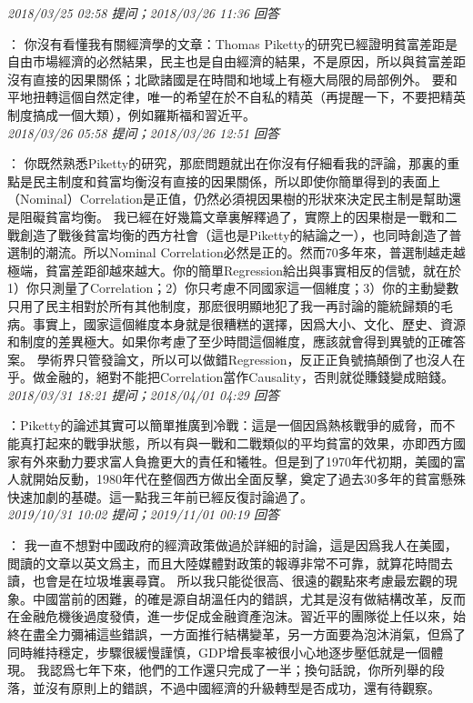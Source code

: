 \documentclass[twocolumn]{ctexart}
\begin{document}
\textit{\hfill\noindent\small 2018/03/25 02:58 提问；2018/03/26 11:36 回答}

：
你沒有看懂我有關經濟學的文章：Thomas Piketty的研究已經證明貧富差距是自由市場經濟的必然結果，民主也是自由經濟的結果，不是原因，所以與貧富差距沒有直接的因果關係；北歐諸國是在時間和地域上有極大局限的局部例外。 
要和平地扭轉這個自然定律，唯一的希望在於不自私的精英（再提醒一下，不要把精英制度搞成一個大類），例如羅斯福和習近平。
\\

\textit{\hfill\noindent\small 2018/03/26 05:58 提问；2018/03/26 12:51 回答}

：
你既然熟悉Piketty的研究，那麽問題就出在你沒有仔細看我的評論，那裏的重點是民主制度和貧富均衡沒有直接的因果關係，所以即使你簡單得到的表面上（Nominal）Correlation是正值，仍然必須視因果樹的形狀來決定民主制是幫助還是阻礙貧富均衡。 
我已經在好幾篇文章裏解釋過了，實際上的因果樹是一戰和二戰創造了戰後貧富均衡的西方社會（這也是Piketty的結論之一），也同時創造了普選制的潮流。所以Nominal Correlation必然是正的。然而70多年來，普選制越走越極端，貧富差距卻越來越大。你的簡單Regression給出與事實相反的信號，就在於1）你只測量了Correlation；2）你只考慮不同國家這一個維度；3）你的主動變數只用了民主相對於所有其他制度，那麽很明顯地犯了我一再討論的籠統歸類的毛病。事實上，國家這個維度本身就是很糟糕的選擇，因爲大小、文化、歷史、資源和制度的差異極大。如果你考慮了至少時間這個維度，應該就會得到異號的正確答案。 
學術界只管發論文，所以可以做錯Regression，反正正負號搞顛倒了也沒人在乎。做金融的，絕對不能把Correlation當作Causality，否則就從賺錢變成賠錢。
\\

\textit{\hfill\noindent\small 2018/03/31 18:21 提问；2018/04/01 04:29 回答}

：Piketty的論述其實可以簡單推廣到冷戰：這是一個因爲熱核戰爭的威脅，而不能真打起來的戰爭狀態，所以有與一戰和二戰類似的平均貧富的效果，亦即西方國家有外來動力要求富人負擔更大的責任和犧牲。但是到了1970年代初期，美國的富人就開始反動，1980年代在整個西方做出全面反擊，奠定了過去30多年的貧富懸殊快速加劇的基礎。這一點我三年前已經反復討論過了。
\\

\textit{\hfill\noindent\small 2019/10/31 10:02 提问；2019/11/01 00:19 回答}

：
我一直不想對中國政府的經濟政策做過於詳細的討論，這是因爲我人在美國，閲讀的文章以英文爲主，而且大陸媒體對政策的報導非常不可靠，就算花時間去讀，也會是在垃圾堆裏尋寶。
所以我只能從很高、很遠的觀點來考慮最宏觀的現象。中國當前的困難，的確是源自胡溫任内的錯誤，尤其是沒有做結構改革，反而在金融危機後過度發債，進一步促成金融資產泡沫。習近平的團隊從上任以來，始終在盡全力彌補這些錯誤，一方面推行結構變革，另一方面要為泡沐消氣，但爲了同時維持穩定，步驟很緩慢謹慎，GDP增長率被很小心地逐步壓低就是一個體現。
我認爲七年下來，他們的工作還只完成了一半；換句話說，你所列舉的段落，並沒有原則上的錯誤，不過中國經濟的升級轉型是否成功，還有待觀察。
\\
\end{document}

